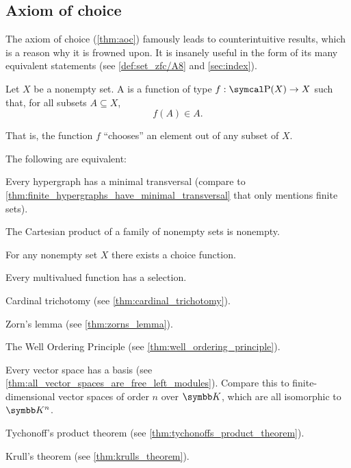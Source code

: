 \subsection{Axiom of choice}\label{subsec:axiom_of_choice}

\begin{remark}\label{remark:aoc}
  The axiom of choice (\cref{thm:aoc}) famously leads to counterintuitive results, which is a reason why it is frowned upon. It is insanely useful in the form of its many equivalent statements (see \cref{def:set_zfc/A8} and \cref{sec:index}).
\end{remark}

\begin{definition}\label{def:choice_function}
  Let \( X \) be a nonempty set. A  is a function of type \( f: \Power(X) \to X \) such that, for all subsets \( A \subseteq X \),
  \begin{equation*}
    f(A) \in A.
  \end{equation*}

  That is, the function \( f \) \enquote{chooses} an element out of any subset of \( X \).
\end{definition}

\begin{theorem}\label{thm:aoc}
  The following are equivalent:

  \begin{thmenum}
    \cite[theorem 6M(4)]{Enderton1977} Every hypergraph has a minimal transversal (compare to \cref{thm:finite_hypergraphs_have_minimal_transversal} that only mentions finite sets).

    \cite[theorem 6M(2)]{Enderton1977} The Cartesian product of a family of nonempty sets is nonempty.

    \cite[theorem 6M(3)]{Enderton1977} For any nonempty set \( X \) there exists a choice function.

    \cite[theorem 6M(1)]{Enderton1977} Every multivalued function has a selection.

     Cardinal trichotomy (see \cref{thm:cardinal_trichotomy}).

     Zorn's lemma (see \cref{thm:zorns_lemma}).

     The Well Ordering Principle (see \cref{thm:well_ordering_principle}).

     Every vector space has a basis (see \cref{thm:all_vector_spaces_are_free_left_modules}). Compare this to finite-dimensional vector spaces of order \( n \) over \( \K \), which are all isomorphic to \( \K^n \).

     Tychonoff's product theorem (see \cref{thm:tychonoffs_product_theorem}).

     Krull's theorem (see \cref{thm:krulls_theorem}).
  \end{thmenum}
\end{theorem}
